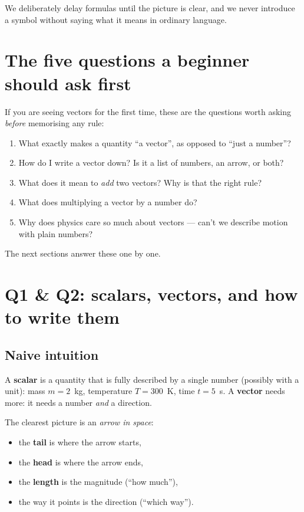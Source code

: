 \documentclass[11pt,a4paper]{article}
\begin{document}
We deliberately delay formulas until the picture is clear, and we never introduce
a symbol without saying what it means in ordinary language.

\section{The five questions a beginner should ask first}

If you are seeing vectors for the first time, these are the questions worth asking
\emph{before} memorising any rule:

\begin{enumerate}[label=\textbf{Q\arabic*.}]
  \item What exactly makes a quantity ``a vector'', as opposed to ``just a number''?
  \item How do I write a vector down? Is it a list of numbers, an arrow, or both?
  \item What does it mean to \emph{add} two vectors? Why is that the right rule?
  \item What does multiplying a vector by a number do?
  \item Why does physics care so much about vectors --- can't we describe motion with plain numbers?
\end{enumerate}

The next sections answer these one by one.

\section{Q1 \& Q2: scalars, vectors, and how to write them}

\subsection*{Naive intuition}

A \textbf{scalar} is a quantity that is fully described by a single number
(possibly with a unit): mass $m = 2$~kg, temperature $T = 300$~K, time $t = 5$~s.
A \textbf{vector} needs more: it needs a number \emph{and} a direction.

The clearest picture is an \emph{arrow in space}:
\begin{itemize}
  \item the \textbf{tail} is where the arrow starts,
  \item the \textbf{head} is where the arrow ends,
  \item the \textbf{length} is the magnitude (``how much''),
  \item the way it points is the direction (``which way'').
\end{itemize}
\end{document}

